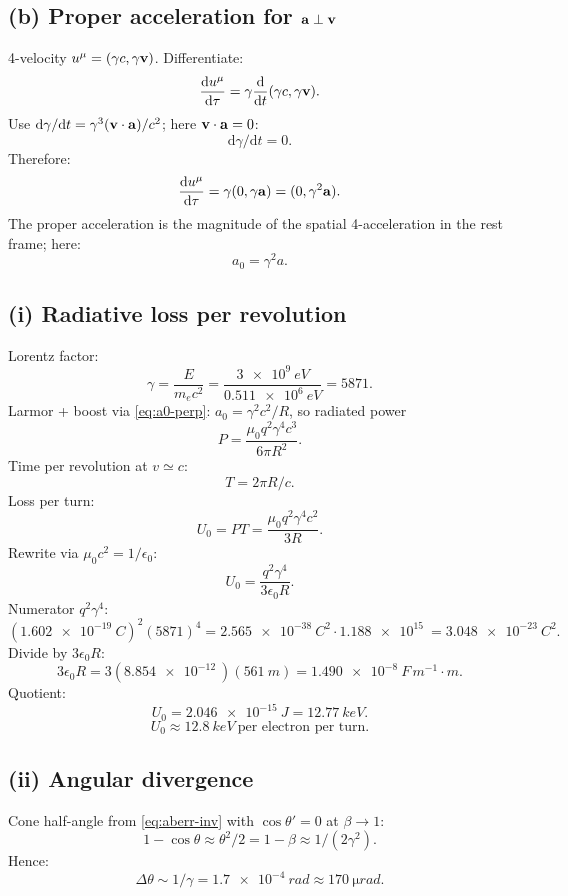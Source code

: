 \documentclass[11pt]{article}
\newcommand{\de}{\mathrm{d}}
\begin{document}
\subsection*{(b) Proper acceleration for $\vb a\perp\vb v$}

4-velocity $u^\mu=(\gamma c,\gamma\vb v)$. Differentiate:
\[ \frac{\de u^\mu}{\de\tau} = \gamma\frac{\de}{\de t}(\gamma c,\gamma\vb v). \]
Use $\de\gamma/\de t=\gamma^3(\vb v\cdot\vb a)/c^2$; here $\vb v\cdot\vb a=0$:
\[ \de\gamma/\de t=0. \]
Therefore:
\[ \frac{\de u^\mu}{\de\tau} = \gamma(0,\gamma\vb a) = (0,\gamma^2\vb a). \]
The proper acceleration is the magnitude of the spatial 4-acceleration in the rest frame; here:
\begin{equation}
\boxed{\;a_0 = \gamma^2 a.\;}
\label{eq:a0-perp}
\end{equation}

\subsection*{(i) Radiative loss per revolution}

Lorentz factor:
\[ \gamma = \frac{E}{m_e c^2} = \frac{\SI{3e9}{eV}}{\SI{0.511e6}{eV}} = 5871. \]
Larmor + boost via \eqref{eq:a0-perp}: $a_0=\gamma^2 c^2/R$, so radiated power
\[ P = \frac{\mu_0 q^2 \gamma^4 c^3}{6\pi R^2}. \]
Time per revolution at $v\simeq c$:
\[ T=2\pi R/c. \]
Loss per turn:
\[ U_0 = P T = \frac{\mu_0 q^2 \gamma^4 c^2}{3 R}. \]
Rewrite via $\mu_0 c^2=1/\epsilon_0$:
\begin{equation}
\boxed{\;U_0 = \frac{q^2\gamma^4}{3\epsilon_0 R}.\;}
\label{eq:U0}
\end{equation}
Numerator $q^2\gamma^4$:
\[ (\SI{1.602e-19}{C})^2 (5871)^4 = \SI{2.565e-38}{C^2}\cdot\SI{1.188e15}{} = \SI{3.048e-23}{C^2}. \]
Divide by $3\epsilon_0 R$:
\[ 3\epsilon_0 R = 3(\SI{8.854e-12}{})(\SI{561}{m}) = \SI{1.490e-8}{F\,m^{-1}\cdot m}. \]
Quotient:
\[ U_0 = \SI{2.046e-15}{J} = \SI{12.77}{keV}. \]
\begin{equation}
\boxed{\;U_0 \approx \SI{12.8}{keV}\ \text{per electron per turn}.\;}
\end{equation}

\subsection*{(ii) Angular divergence}

Cone half-angle from \eqref{eq:aberr-inv} with $\cos\theta'=0$ at $\beta\to1$:
\[ 1-\cos\theta\approx\theta^2/2 = 1-\beta\approx 1/(2\gamma^2). \]
Hence:
\begin{equation}
\boxed{\;\Delta\theta \sim 1/\gamma = \SI{1.7e-4}{rad}\approx\SI{170}{\micro rad}.\;}
\label{eq:divergence}
\end{equation}
\end{document}
